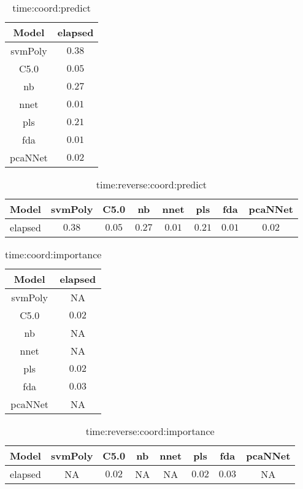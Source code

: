 \begin{table}[!ht]
	\centering
	\begin{tabular}{|c|c|}
		\hline
		Model & elapsed \\ \hline
		svmPoly & $0.38$ \\ \hline
		C5.0 & $0.05$ \\ \hline
		nb & $0.27$ \\ \hline
		nnet & $0.01$ \\ \hline
		pls & $0.21$ \\ \hline
		fda & $0.01$ \\ \hline
		pcaNNet & $0.02$ \\ \hline
	\end{tabular}
	\caption{time:coord:predict}
	\label{tab:time:coord:predict}
\end{table}

\begin{table}[!ht]
	\centering
	\begin{tabular}{|c|c|c|c|c|c|c|c|}
		\hline
		Model & svmPoly & C5.0 & nb & nnet & pls & fda & pcaNNet \\ \hline
		elapsed & $0.38$ & $0.05$ & $0.27$ & $0.01$ & $0.21$ & $0.01$ & $0.02$ \\ \hline
	\end{tabular}
	\caption{time:reverse:coord:predict}
	\label{tab:time:reverse:coord:predict}
\end{table}

\begin{table}[!ht]
	\centering
	\begin{tabular}{|c|c|}
		\hline
		Model & elapsed \\ \hline
		svmPoly & NA \\ \hline
		C5.0 & $0.02$ \\ \hline
		nb & NA \\ \hline
		nnet & NA \\ \hline
		pls & $0.02$ \\ \hline
		fda & $0.03$ \\ \hline
		pcaNNet & NA \\ \hline
	\end{tabular}
	\caption{time:coord:importance}
	\label{tab:time:coord:importance}
\end{table}

\begin{table}[!ht]
	\centering
	\begin{tabular}{|c|c|c|c|c|c|c|c|}
		\hline
		Model & svmPoly & C5.0 & nb & nnet & pls & fda & pcaNNet \\ \hline
		elapsed & NA & $0.02$ & NA & NA & $0.02$ & $0.03$ & NA \\ \hline
	\end{tabular}
	\caption{time:reverse:coord:importance}
	\label{tab:time:reverse:coord:importance}
\end{table}

